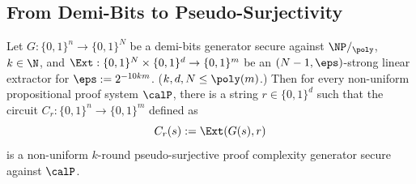 \ThmPVvsAPC*



\subsection{From Demi-Bits to Pseudo-Surjectivity}\label{sec: pseudosurjectivity}

\begin{theorem}\label{thm:pseudo-pcg-fix}
    Let $G:\{0,1\}^n\to\{0,1\}^N$ be a demi-bits generator secure against $\NP/_{\poly}$, $k\in\N$, and $\Ext:\{0,1\}^N\times\{0,1\}^d\to\{0,1\}^m$ be an $(N-1,\eps)$-strong linear extractor for $\eps:=2^{-10km}$. ($k,d,N\leq\poly(m)$.) Then for every non-uniform propositional proof system $\calP$, there is a string $r\in\{0,1\}^d$ such that the circuit $C_r: \{0,1\}^n\to \{0,1\}^m$ defined as
    \[C_r(s) := \Ext(G(s), r)\]
    is a non-uniform $k$-round pseudo-surjective proof complexity generator secure against $\calP$.
\end{theorem}

